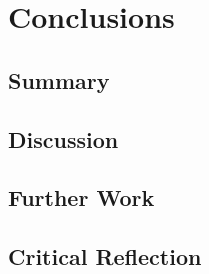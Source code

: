 \chapter{Conclusions}
\label{chap:conc}

\section{Summary}

\section{Discussion}

\section{Further Work}

\section{Critical Reflection}
